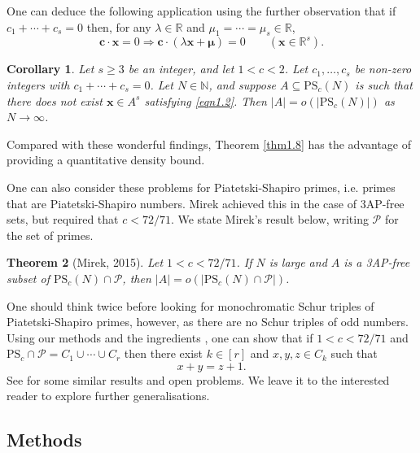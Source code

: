 \documentclass[12pt, reqno]{amsart}
\newtheorem{thm}{Theorem}[section]
\newtheorem{cor}[thm]{Corollary}
\theoremstyle{definition}
\theoremstyle{remark}
\numberwithin{equation}{section}
\theoremstyle{definition}
\def\lam{{\lambda}} \def\Lam{{\Lambda}} \def\Lamtil{{\widetilde \Lambda}}
\def\implies{\Rightarrow}
\def \bN {\mathbb N}
\def \bR {\mathbb R}
\def \bc {\mathbf c}
\def \bx {\mathbf x}
\def \bmu {{\boldsymbol{\mu}}}
\def \cP {\mathcal P}
\def \PS {\mathrm{PS}}
\begin{document}
One can deduce the following application using the further observation that if $c_1 + \cdots + c_s = 0$ then, for any $\lam \in \bR$ and $\mu_1 = \cdots = \mu_s \in \bR$,
\[
\bc \cdot \bx = 0 \implies \bc \cdot (\lam \bx + \bmu) = 0 \qquad (\bx \in \bR^s).
\]

\begin{cor} 
Let $s \ge 3$ be an integer, and let
$1 < c < 2$.
Let $c_1, \ldots, c_s$ be non-zero integers with
$c_1 + \cdots + c_s = 0$.
Let $N \in \bN$, and suppose $A \subseteq \PS_c(N)$ is such that there does not exist $\bx\in A^s$ satisfying \eqref{eqn1.2}. Then
$
|A| = o(|\PS_c(N)|)
$ 
as $N \to \infty$.
\end{cor}

Compared with these wonderful findings, Theorem \ref{thm1.8} has the advantage of providing a quantitative density bound. 

\bigskip

One can also consider these problems for Piatetski-Shapiro primes, i.e. primes that are Piatetski-Shapiro numbers. Mirek \cite{Mir2015} achieved this in the case of 3AP-free sets, but required that $c < 72/71$. We state Mirek's result below, writing $\cP$ for the set of primes.

\begin{thm}
[Mirek, 2015]
Let $1 < c < 72/71$. If $N$ is large and $A$ is a 3AP-free subset of $\PS_c(N) \cap \cP$, then $|A| = o(|\PS_c(N) \cap \cP|)$.
\end{thm}

One should think twice before looking for monochromatic Schur triples of Piatetski-Shapiro primes, however, as there are no Schur triples of odd numbers. Using our methods and the ingredients \cite[Theorem 1.8 and Lemma 1.10]{Mir2015}, one can show that if $1 < c < 72/71$ and $\PS_c \cap \cP = C_1 \cup \cdots \cup C_r$ then there exist $k \in [r]$ and $x,y,z \in C_k$ such that
\[
x + y = z + 1.
\]
See \cite{CC1, Le2012, ZZ2025} for some similar results and open problems. We leave it to the interested reader to explore further generalisations.

\subsection{Methods}
\label{subsec1.3}
\end{document}

